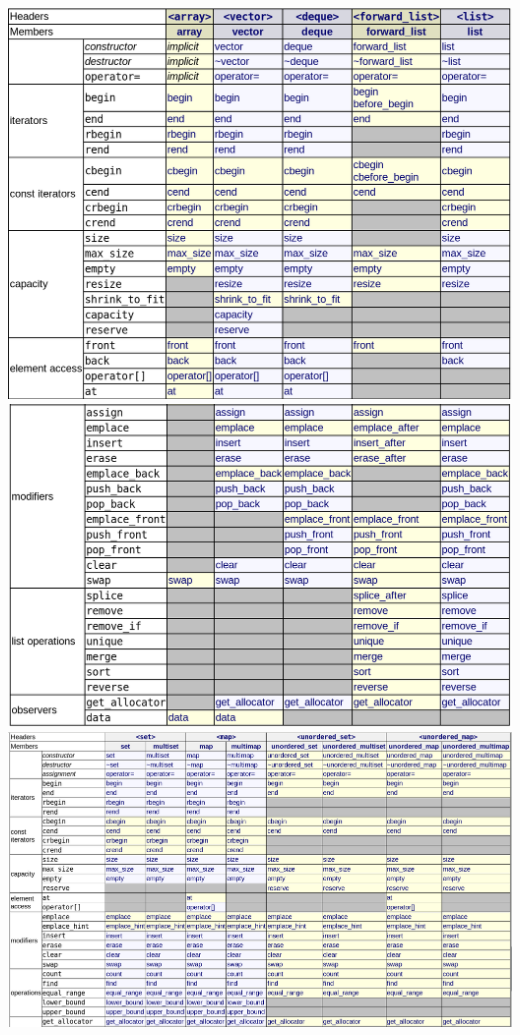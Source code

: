 \documentclass[table]{article}
\begin{document}
\vspace*{-1cm}
\includegraphics[width=\textwidth]{1.png}
\includegraphics[width=\textwidth]{2.png}\\

\vspace*{-1cm}
\hspace*{-2.5cm}\includegraphics[width=0.95\paperwidth]{3.png}\\
\end{document}
